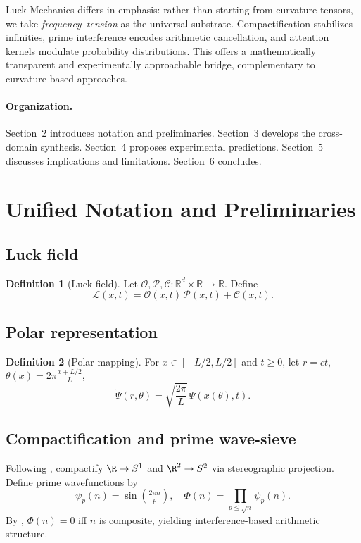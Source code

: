 \documentclass[12pt]{article}
\newcommand{\Luck}{\mathcal{L}}
\newcommand{\Opp}{\mathcal{O}}
\newcommand{\Prep}{\mathcal{P}}
\newcommand{\Circ}{\mathcal{C}}
\newcommand{\Psit}{\tilde{\Psi}}
\theoremstyle{plain}
\theoremstyle{definition}
\newtheorem{definition}{Definition}
\begin{document}
Luck Mechanics differs in emphasis: rather than starting from curvature tensors, we take \emph{frequency–tension} as the universal substrate. Compactification stabilizes infinities, prime interference encodes arithmetic cancellation, and attention kernels modulate probability distributions. This offers a mathematically transparent and experimentally approachable bridge, complementary to curvature-based approaches.

\paragraph{Organization.}  
Section~2 introduces notation and preliminaries. Section~3 develops the cross-domain synthesis. Section~4 proposes experimental predictions. Section~5 discusses implications and limitations. Section~6 concludes.



\section{Unified Notation and Preliminaries}
\subsection{Luck field}
\begin{definition}[Luck field]
Let \(\Opp,\Prep,\Circ : \mathbb{R}^d \times \mathbb{R} \to \mathbb{R}\). Define
\[
\Luck(x,t) = \Opp(x,t)\,\Prep(x,t) + \Circ(x,t).
\]
\end{definition}

\subsection{Polar representation}
\begin{definition}[Polar mapping]
For \(x \in [-L/2,L/2]\) and \(t \ge 0\), let \(r = c t\), \(\theta(x) = 2\pi\frac{x + L/2}{L}\),
\[
\Psit(r,\theta) = \sqrt{\frac{2\pi}{L}}\,\Psi(x(\theta), t).
\]
\end{definition}

\subsection{Compactification and prime wave-sieve}
Following \cite{valvo2024limits}, compactify $\R \to S^1$ and $\R^2 \to S^2$ via stereographic projection. Define prime wavefunctions by
\[
\psi_p(n) = \sin\!\left(\tfrac{2\pi n}{p}\right), 
\quad \Phi(n) = \prod_{p \le \sqrt{n}} \psi_p(n).
\]
By \cite{ashiru2024wave}, $\Phi(n)=0$ iff $n$ is composite, yielding interference-based arithmetic structure.
\end{document}
